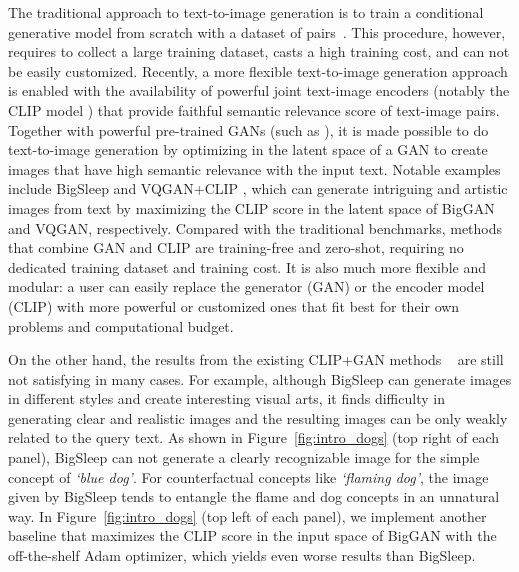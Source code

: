 \documentclass[10pt,twocolumn,letterpaper]{article}
\newcommand{\ganclip}{CLIP+GAN}
\begin{document}
The traditional approach to text-to-image generation is to train 
a conditional generative model from scratch with 
a dataset of  pairs~\cite{mansimov2015generating, reed2016generative, xu2018attngan, li2019object, tao2020df, ramesh2021zero}. 
This procedure, however, requires to collect a large training dataset, casts a high training cost, and can not be easily customized. 
Recently,
a more flexible text-to-image generation approach is enabled 
with the availability of powerful joint text-image encoders (notably the CLIP model \cite{radford2021learning}) that provide 
faithful semantic relevance score of text-image pairs.
Together with powerful pre-trained GANs (such as  \cite{abdal2019image2stylegan, brock2018large, li2019object, zhu2019dm}),
it is made possible to do text-to-image generation 
by optimizing in the latent space of a GAN to create images 
that have high semantic relevance with the input text. 
Notable examples include BigSleep \cite{bigsleep}
and VQGAN+CLIP \cite{VQGANCLIP}, which can generate intriguing and artistic images  
from text by maximizing the CLIP score in the latent space of BigGAN and VQGAN, respectively. Compared with the traditional benchmarks, 
methods that combine 
GAN and CLIP are training-free and zero-shot, 
requiring no dedicated training dataset and training cost.  
It is also much more flexible and modular: 
a user can easily replace the generator (GAN) or the encoder model (CLIP)
with more powerful or customized ones 
that fit best for their own problems and computational budget. 


On the other hand, the results from 
the existing {\ganclip} methods ~\cite{bigsleep, galatolo2021generating, VQGANCLIP}
are still not satisfying in many cases.   
For example, although BigSleep can generate 
images in different styles and create interesting visual arts, 
it finds difficulty in generating clear and realistic images and the resulting images can be only weakly related to the query text.
As shown in Figure~\ref{fig:intro_dogs} (top right of each panel),   
BigSleep can not generate a clearly recognizable image
for the simple concept of \emph{`blue dog'}.
For counterfactual concepts like \emph{`flaming dog'}, 
the image given by BigSleep tends to entangle the flame and dog concepts in an unnatural way. 
In Figure~\ref{fig:intro_dogs} (top left of each panel),
we  implement another baseline that  maximizes the CLIP score 
in the input space of BigGAN \cite{brock2018large} with the off-the-shelf Adam \cite{kingma2015adam} optimizer, which yields even worse results than BigSleep. 
\end{document}
